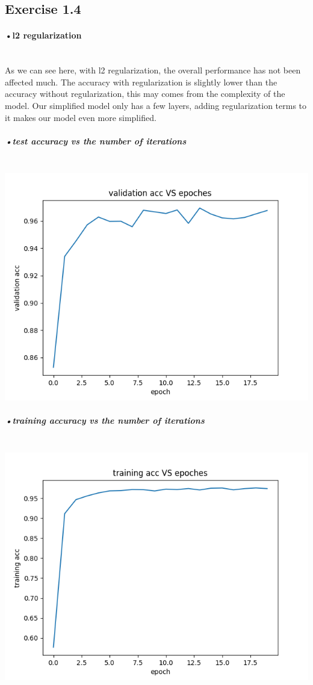 \documentclass[11pt]{article} %
\begin{document}
\subsection{Exercise 1.4}
\paragraph{•l2 regularization}\mbox{}\\
As we can see here, with l2 regularization, the overall performance has not been affected much. The accuracy with regularization is slightly lower than the accuracy without regularization, this may comes from the complexity of the model. Our simplified model only has a few layers, adding regularization terms to it makes our model even more simplified.
\subparagraph{•test accuracy vs the number of iterations}\mbox{}\\
\includegraphics[scale=0.5]{e141val_acc.png}
\subparagraph{•training accuracy vs the number of iterations}\mbox{}\\
\includegraphics[scale=0.5]{e141train_acc.png}
\end{document}
